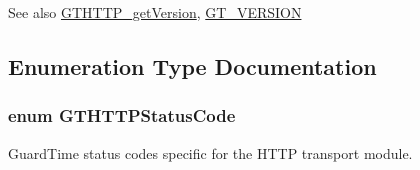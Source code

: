 \begin{DoxySeeAlso}{See also}
\hyperlink{group__http_gaf8fed890ccd3245cc91dcf656f969f6f}{GTHTTP\_\-getVersion}, \hyperlink{group__common_gafdac78985a08fc5052b1d1f2888a25c9}{GT\_\-VERSION} 
\end{DoxySeeAlso}


\subsection{Enumeration Type Documentation}
\hypertarget{group__http_ga9f42032eb2905e40ee6fe84e0dfc03c2}{
\subsubsection[{GTHTTPStatusCode}]{\setlength{\rightskip}{0pt plus 5cm}enum {\bf GTHTTPStatusCode}}}
\label{group__http_ga9f42032eb2905e40ee6fe84e0dfc03c2}
GuardTime status codes specific for the HTTP transport module.

